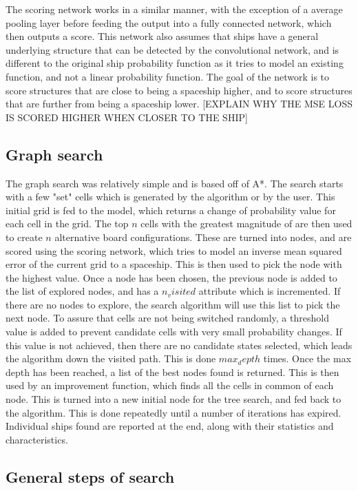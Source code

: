 \documentclass{l4proj}
\begin{document}
The scoring network works in a similar manner, with the exception of a average pooling layer before feeding the output into a fully connected network, which then outputs a score. This network also assumes that ships have a general underlying structure that can be detected by the convolutional network, and is different to the original ship probability function as it tries to model an existing function, and not a linear probability function. The goal of the network is to score structures that are close to being a spaceship higher, and to score structures that are further from being a spaceship lower. [EXPLAIN WHY THE MSE LOSS IS SCORED HIGHER WHEN CLOSER TO THE SHIP]

\subsection{Graph search}

The graph search was relatively simple and is based off of A*. The search starts with a few "set" cells which is generated by the algorithm or by the user. This initial grid is fed to the model, which returns a change of probability value for each cell in the grid. The top $n$ cells with the greatest magnitude of are then used to create $n$ alternative board configurations. These are turned into nodes, and are scored using the scoring network, which tries to model an inverse mean squared error of the current grid to a spaceship. This is then used to pick the node with the highest value. Once a node has been chosen, the previous node is added to the list of explored nodes, and has a $n_visited$ attribute which is incremented. If there are no nodes to explore, the search algorithm will use this list to pick the next node. To assure that cells are not being switched randomly, a threshold value is added to prevent candidate cells with very small probability changes. If this value is not achieved, then there are no candidate states selected, which leads the algorithm down the visited path. This is done $max_depth$ times. Once the max depth has been reached, a list of the best nodes found is returned. This is then used by an improvement function, which finds all the cells in common of each node. This is turned into a new initial node for the tree search, and fed back to the algorithm. This is done repeatedly until a number of iterations has expired. Individual ships found are reported at the end, along with their statistics and characteristics.

\subsection{General steps of search}
\end{document}
